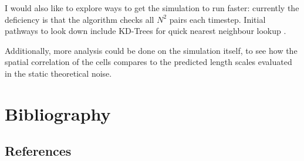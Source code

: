 \documentclass[11pt,a4paper]{article}
\begin{document}
I would also like to explore ways to get the simulation to run faster: currently the deficiency is that the algorithm checks all $N^2$ pairs each timestep. Initial pathways to look down include KD-Trees for quick nearest neighbour lookup \cite{kdtree}.

Additionally, more analysis could be done on the simulation itself, to see how the spatial correlation of the cells compares to the predicted length scales evaluated in the static theoretical noise.

\section{Bibliography}

\subsection{References}
\end{document}
